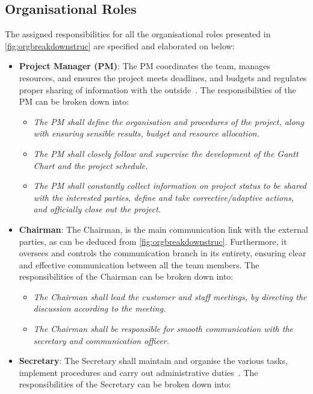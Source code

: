 \subsection{Organisational Roles}\label{sec:org-roles}
The assigned responsibilities for all the organisational roles presented in \cref{fig:orgbreakdownstruc} are specified and elaborated on below:
\begin{itemize}
    \item \textbf{Project Manager (PM)}: The PM coordinates the team, manages resources, and ensures the project meets deadlines, and budgets and regulates proper sharing of information with the outside~\cite{dsePMSESlides1}.
    The responsibilities of the PM can be broken down into:
    \begin{itemize}
        \item \textit{The PM shall define the organisation and procedures of the project, along with ensuring sensible results, budget and resource allocation.}
        \item \textit{The PM shall closely follow and supervise the development of the Gantt Chart and the project schedule.}
        \item \textit{The PM shall constantly collect information on project status to be shared with the interested parties, define and take corrective/adaptive actions, and officially close out the project.}
    \end{itemize}
    \item \textbf{Chairman}: The Chairman, is the main communication link with the external parties, as can be deduced from \cref{fig:orgbreakdownstruc}.
    Furthermore, it oversees and controls the communication branch in its entirety, ensuring clear and effective communication between all the team members.
    The responsibilities of the Chairman can be broken down into:
    \begin{itemize}
        \item \textit{The Chairman shall lead the customer and staff meetings, by directing the discussion according to the meeting.}
        \item \textit{The Chairman shall be responsible for smooth communication with the secretary and communication officer.}
    \end{itemize}
    \item \textbf{Secretary}: The Secretary shall maintain and organise the various tasks, implement procedures and carry out administrative duties~\cite{SysEngrespons}.
    The responsibilities of the Secretary can be broken down into:

\end{itemize}
